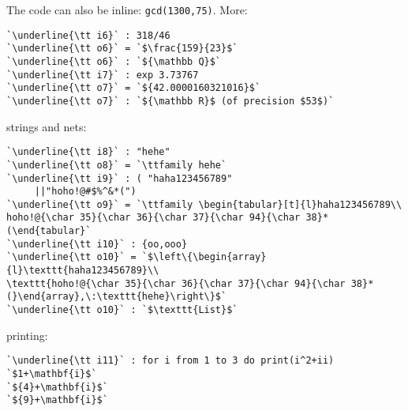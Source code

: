 \documentclass[12pt,a4paper]{amsart}
\begin{document}
The code can also be inline: \lstinline[language=Macaulay2]!gcd(1300,75)!.
More:
\begin{lstlisting}[language=Macaulay2output]
`\underline{\tt i6}` : 318/46
`\underline{\tt o6}` = `$\frac{159}{23}$`
`\underline{\tt o6}` : `${\mathbb Q}$`
`\underline{\tt i7}` : exp 3.73767
`\underline{\tt o7}` = `${42.0000160321016}$`
`\underline{\tt o7}` : `${\mathbb R}$ (of precision $53$)`
\end{lstlisting}
strings and nets:
\begin{lstlisting}[language=Macaulay2output]
`\underline{\tt i8}` : "hehe"
`\underline{\tt o8}` = `\ttfamily hehe`
`\underline{\tt i9}` : ( "haha123456789"
     ||"hoho!@#$%^&*(")
`\underline{\tt o9}` = `\ttfamily \begin{tabular}[t]{l}haha123456789\\
hoho!@{\char 35}{\char 36}{\char 37}{\char 94}{\char 38}*(\end{tabular}`
`\underline{\tt i10}` : {oo,ooo}
`\underline{\tt o10}` = `$\left\{\begin{array}{l}\texttt{haha123456789}\\
\texttt{hoho!@{\char 35}{\char 36}{\char 37}{\char 94}{\char 38}*(}\end{array},\:\texttt{hehe}\right\}$`
`\underline{\tt o10}` : `$\texttt{List}$`
\end{lstlisting}
printing:
\begin{lstlisting}[language=Macaulay2output]
`\underline{\tt i11}` : for i from 1 to 3 do print(i^2+ii)
`$1+\mathbf{i}$`
`${4}+\mathbf{i}$`
`${9}+\mathbf{i}$`
\end{lstlisting}
\end{document}
